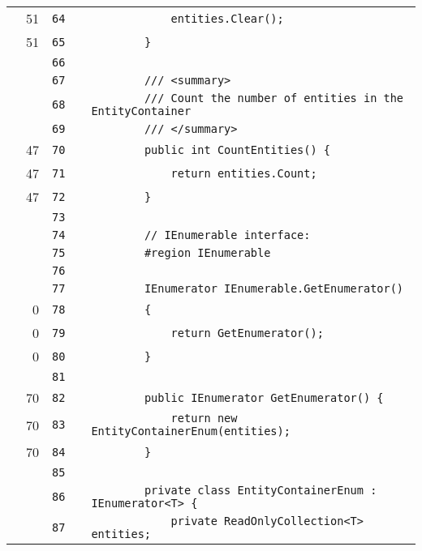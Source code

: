\documentclass[a4paper,landscape,10pt]{article}
\begin{document}
\begin{longtable}[l]{lrrll}
\cellcolor{green} & 51 & \verb~64~ & & \verb~            entities.Clear();~\\
\cellcolor{green} & 51 & \verb~65~ & & \verb~        }~\\
\cellcolor{gray} &  & \verb~66~ & & \verb~~\\
\cellcolor{gray} &  & \verb~67~ & & \verb~        /// <summary>~\\
\cellcolor{gray} &  & \verb~68~ & & \verb~        /// Count the number of entities in the EntityContainer~\\
\cellcolor{gray} &  & \verb~69~ & & \verb~        /// </summary>~\\
\cellcolor{green} & 47 & \verb~70~ & & \verb~        public int CountEntities() {~\\
\cellcolor{green} & 47 & \verb~71~ & & \verb~            return entities.Count;~\\
\cellcolor{green} & 47 & \verb~72~ & & \verb~        }~\\
\cellcolor{gray} &  & \verb~73~ & & \verb~~\\
\cellcolor{gray} &  & \verb~74~ & & \verb~        // IEnumerable interface:~\\
\cellcolor{gray} &  & \verb~75~ & & \verb~        #region IEnumerable~\\
\cellcolor{gray} &  & \verb~76~ & & \verb~~\\
\cellcolor{gray} &  & \verb~77~ & & \verb~        IEnumerator IEnumerable.GetEnumerator()~\\
\cellcolor{red} & 0 & \verb~78~ & & \verb~        {~\\
\cellcolor{red} & 0 & \verb~79~ & & \verb~            return GetEnumerator();~\\
\cellcolor{red} & 0 & \verb~80~ & & \verb~        }~\\
\cellcolor{gray} &  & \verb~81~ & & \verb~~\\
\cellcolor{green} & 70 & \verb~82~ & & \verb~        public IEnumerator GetEnumerator() {~\\
\cellcolor{green} & 70 & \verb~83~ & & \verb~            return new EntityContainerEnum(entities);~\\
\cellcolor{green} & 70 & \verb~84~ & & \verb~        }~\\
\cellcolor{gray} &  & \verb~85~ & & \verb~~\\
\cellcolor{gray} &  & \verb~86~ & & \verb~        private class EntityContainerEnum : IEnumerator<T> {~\\
\cellcolor{gray} &  & \verb~87~ & & \verb~            private ReadOnlyCollection<T> entities;~\\

\end{longtable}
\end{document}
